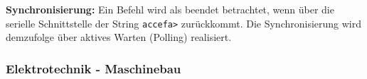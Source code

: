 \noindent
\textbf{Synchronisierung:} Ein Befehl wird als beendet betrachtet, wenn über die serielle Schnittstelle der String \texttt{accefa>} zurückkommt. Die Synchronisierung wird demzufolge über aktives Warten (Polling) realisiert.

\subsubsection{Elektrotechnik - Maschinebau}

